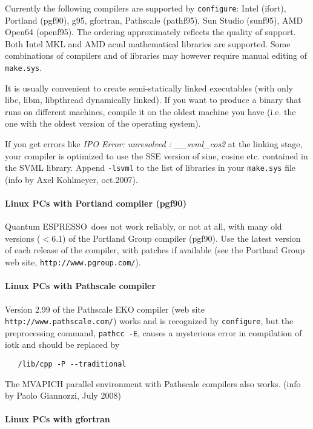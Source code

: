 \documentclass[12pt,a4paper]{article}
\def\qe{{\sc Quantum ESPRESSO}}
\def\configure{\texttt{configure}}
\begin{document}
Currently the following compilers are supported by \configure:
Intel (ifort), Portland (pgf90), g95, gfortran, Pathscale (pathf95), 
Sun Studio (sunf95),  AMD Open64 (openf95). The ordering approximately
reflects the quality of support. Both Intel MKL and AMD acml mathematical
libraries are supported. Some combinations of compilers and of libraries
may however require manual editing of \texttt{make.sys}.

It is usually convenient to create semi-statically linked executables (with only
libc, libm, libpthread dynamically linked). If you want to produce a binary
that runs on different machines, compile it on the oldest machine you have
(i.e. the one with the oldest version of the operating system).

If you get errors like {\em IPO Error: unresolved : \_\_svml\_cos2}
at the linking stage, your compiler is optimized to use the SSE
version of sine, cosine etc. contained in the SVML library. Append
\texttt{-lsvml} to the list of libraries in your \texttt{make.sys} file (info by Axel
Kohlmeyer, oct.2007). 

\paragraph{Linux PCs with Portland compiler (pgf90)}

\qe\ does not work reliably, or not at all, with many old
versions ($< 6.1$) of the Portland Group compiler (pgf90).
 Use the latest version of each 
release of the compiler, with patches if available (see
the Portland Group web site, \texttt{http://www.pgroup.com/}).

\paragraph{Linux PCs with Pathscale compiler}

Version 2.99 of the Pathscale EKO compiler (web site
\texttt{http://www.pathscale.com/})
works and is recognized by
\configure, but the preprocessing command, \texttt{pathcc -E},
causes a mysterious error in compilation of iotk and should be replaced by
\begin{verbatim}
   /lib/cpp -P --traditional
\end{verbatim}
The MVAPICH parallel environment with Pathscale compilers also works.
(info by Paolo Giannozzi, July 2008)

\paragraph{Linux PCs with gfortran}
\end{document}
